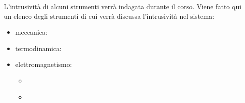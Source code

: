 \documentclass[letterpaper,10pt,italian]{jupyterBook}
\begin{document}
\sphinxAtStartPar
L’intrusività di alcuni strumenti verrà indagata durante il corso. Viene fatto qui un elenco degli strumenti di cui verrà discussa l’intrusività nel sistema:
\begin{itemize}
\item {} 
\sphinxAtStartPar
meccanica:

\item {} 
\sphinxAtStartPar
termodinamica:

\item {} 
\sphinxAtStartPar
elettromagnetismo:
\begin{itemize}
\item {} 
\sphinxAtStartPar
{\hyperref[\detokenize{ch/electromagnetism/electromagnetism-steady:physics-hs-electromagnetism-electromagnetism-steady-experience-faraday-amperometer}]{}}

\item {} 
\sphinxAtStartPar
{\hyperref[\detokenize{ch/electromagnetism/electromagnetism-steady:physics-hs-electromagnetism-electromagnetism-steady-experience-faraday-voltmeter}]{}}

\end{itemize}

\end{itemize}

\sphinxstepscope
\end{document}
